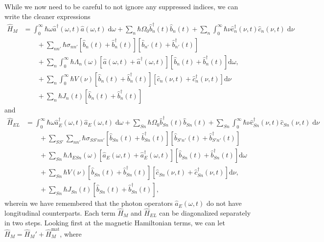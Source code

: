 \documentclass{article}
\begin{document}
While we now need to be careful to not ignore any suppressed indices, we can write the cleaner expressions
\begin{equation}
\begin{split}
\hat{H}_M &= \int_0^\infty\hbar\omega\hat{a}^\dagger(\omega,t)\hat{a}(\omega,t)\;\mathrm{d}\omega + \sum_n\hbar\Omega_0\hat{b}_n^\dagger(t)\hat{b}_n(t) + \sum_n\int_0^\infty\hbar\nu\hat{c}_n^\dagger(\nu,t)\hat{c}_n(\nu,t)\;\mathrm{d}\nu\\
&\qquad + \sum_{nn'}\hbar\sigma_{nn'}\left[\hat{b}_n(t) + \hat{b}_n^\dagger(t)\right]\left[\hat{b}_{n'}(t) + \hat{b}_{n'}^\dagger(t)\right] \\
&\qquad + \sum_n\int_0^\infty\hbar\Lambda_n(\omega)\left[\hat{a}(\omega,t) + \hat{a}^\dagger(\omega,t)\right]\left[\hat{b}_n(t) + \hat{b}_n^\dagger(t)\right]\mathrm{d}\omega,\\
&\qquad + \sum_n\int_0^\infty\hbar V(\nu)\left[\hat{b}_n(t) + \hat{b}_n^\dagger(t)\right]\left[\hat{c}_n(\nu,t) + \hat{c}_n^\dagger(\nu,t)\right]\mathrm{d}\nu\\
&\qquad + \sum_n\hbar J_n(t)\left[\hat{b}_n(t) + \hat{b}_n^\dagger(t)\right]
\end{split}
\end{equation}
and
\begin{equation}
\begin{split}
\hat{H}_{EL} &= \int_0^\infty\hbar\omega\hat{a}_E^\dagger(\omega,t)\hat{a}_E(\omega,t)\;\mathrm{d}\omega + \sum_{Sn}\hbar\Omega_0\hat{b}_{Sn}^\dagger(t)\hat{b}_{Sn}(t) + \sum_{Sn}\int_0^\infty\hbar\nu\hat{c}_{Sn}^\dagger(\nu,t)\hat{c}_{Sn}(\nu,t)\;\mathrm{d}\nu\\
&\qquad + \sum_{SS'}\sum_{nn'}\hbar\sigma_{SS'nn'}\left[\hat{b}_{Sn}(t) + \hat{b}_{Sn}^\dagger(t)\right]\left[\hat{b}_{S'n'}(t) + \hat{b}_{S'n'}^\dagger(t)\right]\\
&\qquad + \sum_{Sn}\hbar\Lambda_{ESn}(\omega)\left[\hat{a}_{E}(\omega,t) + \hat{a}_{E}^\dagger(\omega,t)\right]\left[\hat{b}_{Sn}(t) + \hat{b}_{Sn}^\dagger(t)\right]\mathrm{d}\omega\\
&\qquad + \sum_{Sn}\hbar V(\nu)\left[\hat{b}_{Sn}(t) + \hat{b}_{Sn}^\dagger(t)\right]\left[\hat{c}_{Sn}(\nu,t) + \hat{c}_{Sn}^\dagger(\nu,t)\right]\mathrm{d}\nu,\\
&\qquad + \sum_{Sn}\hbar J_{Sn}(t)\left[\hat{b}_{Sn}(t) + \hat{b}_{Sn}^\dagger(t)\right],
\end{split}
\end{equation}
wherein we have remembered that the photon operators $\hat{a}_E(\omega,t)$ do not have longitudinal counterparts. Each term $\hat{H}_M$ and $\hat{H}_{EL}$ can be diagonalized separately in two steps. Looking first at the magnetic Hamiltonian terms, we can let $\hat{H}_M = \hat{H}_M' + \hat{H}_M^\mathrm{mat}$, where
\end{document}
